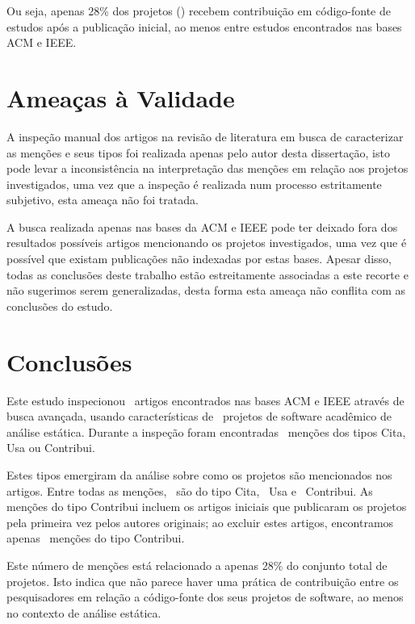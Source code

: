 Ou seja, apenas 28\% dos projetos (\unskip)
recebem contribuição em código-fonte de estudos após a publicação inicial, ao
menos entre estudos encontrados nas bases ACM e IEEE.


\section{Ameaças à Validade}  \label{estudo2:ameacas} %

A inspeção manual dos artigos na revisão de literatura em busca de caracterizar
as menções e seus tipos foi realizada apenas pelo autor desta dissertação, isto
pode levar a inconsistência na interpretação das menções em relação aos projetos
investigados, uma vez que a inspeção é realizada num processo estritamente
subjetivo, esta ameaça não foi tratada.

A busca realizada apenas nas bases da ACM e IEEE pode ter deixado fora dos
resultados possíveis artigos mencionando os projetos investigados, uma vez que
é possível que existam publicações não indexadas por estas bases. Apesar disso,
todas as conclusões deste trabalho estão estreitamente associadas a este recorte e não
sugerimos serem generalizadas, desta forma esta ameaça não conflita com as conclusões
do estudo.


\section{Conclusões} \label{estudo2:conclusoes} %

Este estudo inspecionou \SearchUniqueCount \ artigos encontrados nas bases ACM
e IEEE através de busca avançada, usando características de \SoftwareCount \
projetos de software acadêmico de análise estática. Durante a inspeção foram
encontradas \ScreeningCount \ menções dos tipos Cita, Usa ou
Contribui.

Estes tipos emergiram da análise sobre como os projetos são mencionados nos
artigos. Entre todas as menções, \CiteCount \ são do tipo Cita, \UseCount \ Usa
e \ContributeCount \ Contribui. As menções do tipo Contribui incluem os artigos
iniciais que publicaram os projetos pela primeira vez pelos autores originais;
ao excluir estes artigos, encontramos apenas \ContributeStudyDoisCount \ menções
do tipo Contribui.

Este número de menções está relacionado a apenas 28\% do conjunto total de
projetos. Isto indica que não parece haver uma prática de contribuição entre os
pesquisadores em relação a código-fonte dos seus projetos de software, ao menos
no contexto de análise estática.

